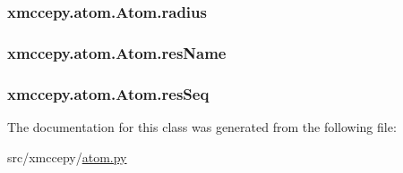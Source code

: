\hypertarget{classxmccepy_1_1atom_1_1_atom_af0235fff236afb4e97011731adb22f55}{
\subsubsection[{radius}]{\setlength{\rightskip}{0pt plus 5cm}xmccepy.\-atom.\-Atom.\-radius}}\label{classxmccepy_1_1atom_1_1_atom_af0235fff236afb4e97011731adb22f55}
\hypertarget{classxmccepy_1_1atom_1_1_atom_a7fe1185c33a55254824b54ef1218de51}{
\subsubsection[{res\-Name}]{\setlength{\rightskip}{0pt plus 5cm}xmccepy.\-atom.\-Atom.\-res\-Name}}\label{classxmccepy_1_1atom_1_1_atom_a7fe1185c33a55254824b54ef1218de51}
\hypertarget{classxmccepy_1_1atom_1_1_atom_a539eb962040217d58384463edbc73718}{
\subsubsection[{res\-Seq}]{\setlength{\rightskip}{0pt plus 5cm}xmccepy.\-atom.\-Atom.\-res\-Seq}}\label{classxmccepy_1_1atom_1_1_atom_a539eb962040217d58384463edbc73718}


The documentation for this class was generated from the following file\-:\begin{DoxyCompactItemize}
\item 
src/xmccepy/\hyperlink{atom_8py}{atom.\-py}\end{DoxyCompactItemize}
